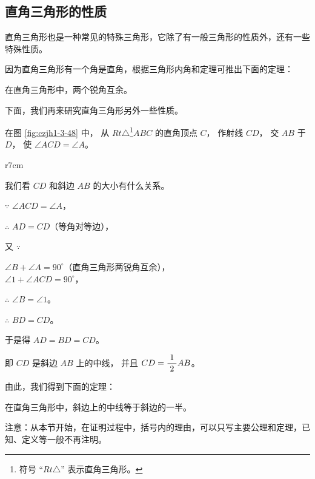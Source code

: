 \subsection{直角三角形的性质}\label{subsec:czjh1-3-12}
\begin{enhancedline}

直角三角形也是一种常见的特殊三角形，它除了有一般三角形的性质外，还有一些特殊性质。

因为直角三角形有一个角是直角，根据三角形内角和定理可推出下面的定理：

\begin{dingli}[定理1]
    在直角三角形中，两个锐角互余。
\end{dingli}

下面，我们再来研究直角三角形另外一些性质。

在图 \ref{fig:czjh1-3-48} 中， 从 $Rt \triangle$\footnote{符号 “$Rt \triangle$” 表示直角三角形。}$ABC$ 的直角顶点 $C$，
作射线 $CD$， 交 $AB$ 于 $D$， 使 $\angle ACD = \angle A$。

\begin{wrapfigure}[6]{r}{7cm}
    \centering
    
    \caption{}\label{fig:czjh1-3-48}
\end{wrapfigure}

我们看 $CD$ 和斜边 $AB$ 的大小有什么关系。

$\because$ \quad $\angle ACD = \angle A$，

$\therefore$ \quad $AD = CD$（等角对等边），

又 $\because$ \quad \begin{zmtblr}[t]{}
    $\angle B + \angle A = 90^\circ$（直角三角形两锐角互余），\\
    $\angle 1 + \angle ACD = 90^\circ$，
\end{zmtblr}


$\therefore$ \quad $\angle B = \angle 1$。

$\therefore$ \quad $BD = CD$。

于是得 \quad $AD = BD = CD$。

即 \quad $CD$ 是斜边 $AB$ 上的中线， 并且 $CD = \dfrac{\; 1 \;}{2} AB$。

由此，我们得到下面的定理：

\begin{dingli}[定理2]
    在直角三角形中，斜边上的中线等于斜边的一半。
\end{dingli}

注意：从本节开始，在证明过程中，括号内的理由，可以只写主要公理和定理，已知、定义等一般不再注明。


\end{enhancedline}
